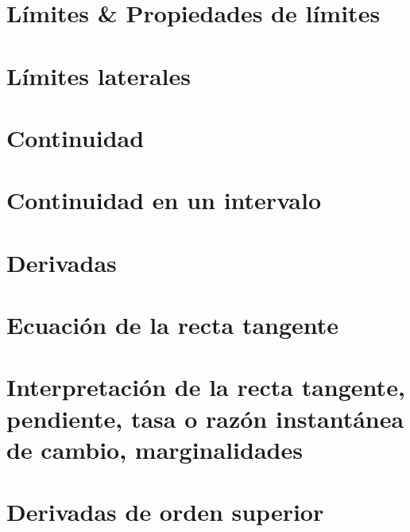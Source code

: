 \documentclass{book}
\begin{document}
\chapter{Límites \& Propiedades de límites}


\chapter{Límites laterales}


\chapter{Continuidad}


\chapter{Continuidad en un intervalo}


\chapter{Derivadas}


\chapter{Ecuación de la recta tangente}


\chapter{Interpretación de la recta tangente, pendiente, tasa o razón instantánea de cambio, marginalidades}


\chapter{Derivadas de orden superior}

\end{document}
